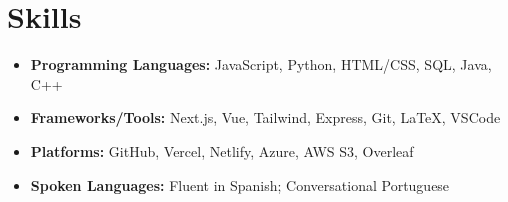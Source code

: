 \documentclass[letterpaper,10pt]{article}
\begin{document}
\section*{Skills}
\begin{itemize}[leftmargin=0.15in, label={}]
  \item \textbf{Programming Languages:} JavaScript, Python, HTML/CSS, SQL, Java, C++
  \item \textbf{Frameworks/Tools:} Next.js, Vue, Tailwind, Express, Git, LaTeX, VSCode
  \item \textbf{Platforms:} GitHub, Vercel, Netlify, Azure, AWS S3, Overleaf
  \item \textbf{Spoken Languages:} Fluent in Spanish; Conversational Portuguese
\end{itemize}
\end{document}
